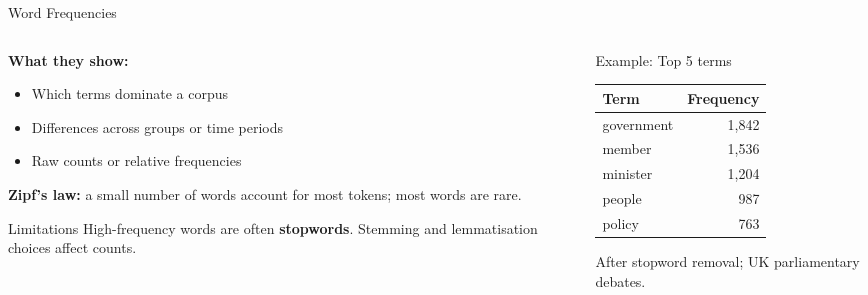 \documentclass[aspectratio=169]{beamer}
\begin{document}
\begin{frame}{Word Frequencies}
    \small
    \begin{columns}[T]
        \begin{column}{0.52\textwidth}
            \textbf{What they show:}
            \begin{itemize}\setlength\itemsep{0pt}
                \item Which terms dominate a corpus
                \item Differences across groups or time periods
                \item Raw counts or relative frequencies
            \end{itemize}

            \vspace{0.2cm}
            \textbf{\color{sgsssGreen} Zipf's law:} a small number of words account for most tokens; most words are rare.

            \vspace{0.2cm}
            \begin{alertblock}{Limitations}
                \footnotesize
                High-frequency words are often \textbf{stopwords}. Stemming and lemmatisation choices affect counts.
            \end{alertblock}
        \end{column}
        \begin{column}{0.44\textwidth}
            \begin{exampleblock}{Example: Top 5 terms}
                \footnotesize
                \begin{tabular}{@{}lr@{}}
                    \toprule
                    \textbf{Term} & \textbf{Frequency} \\
                    \midrule
                    government  & 1{,}842 \\
                    member      & 1{,}536 \\
                    minister    & 1{,}204 \\
                    people      &   987 \\
                    policy      &   763 \\
                    \bottomrule
                \end{tabular}
            \end{exampleblock}
            {\scriptsize After stopword removal; UK parliamentary debates.}
        \end{column}
    \end{columns}
\end{frame}
\end{document}

